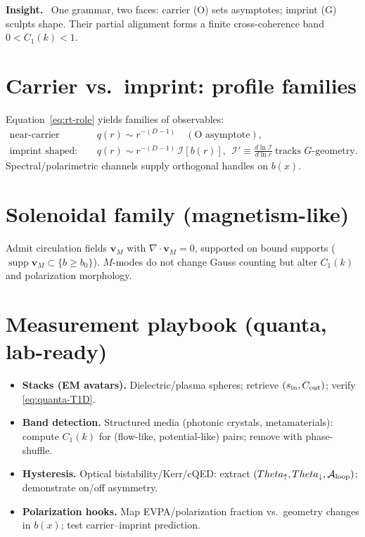 \documentclass[12pt,a4paper,oneside]{scrreprt}
\def\Theta{Theta}%
\newenvironment{insight}{\par\vspace{0.5em}\noindent\textbf{Insight.}\ }{\par\vspace{0.5em}}
\begin{document}
\begin{insight}
One grammar, two faces: carrier (O) sets asymptotes; imprint (G) sculpts shape. Their partial alignment forms a finite cross-coherence band $0<C_1(k)<1$.
\end{insight}

\section{Carrier vs.\ imprint: profile families}\label{sec:carrier-imprint}
Equation~\eqref{eq:rt-role} yields families of observables:
\begin{align}
\text{near-carrier dominated: } & q(r)\sim r^{-(D-1)} \quad (\text{O asymptote}),\\
\text{imprint shaped: } & q(r)\sim r^{-(D-1)}\,\mathcal I[b(r)],\ \ 
\mathcal I' \equiv \frac{d\ln \mathcal I}{d\ln r} \ \text{tracks $G$-geometry}.
\end{align}
Spectral/polarimetric channels supply orthogonal handles on $b(x)$.

\section{Solenoidal family (magnetism-like)}\label{sec:solenoids}
Admit circulation fields $\mathbf v_M$ with $\nabla\!\cdot\mathbf v_M=0$, supported on bound supports ($\operatorname{supp}\mathbf v_M\subset\{b\ge b_0\}$). $M$-modes do not change Gauss counting but alter $C_1(k)$ and polarization morphology.

\section{Measurement playbook (quanta, lab-ready)}\label{sec:quanta-playbook}
\begin{itemize}
\item \textbf{Stacks (EM avatars).} Dielectric/plasma spheres; retrieve $(s_{\rm in},C_{\rm out})$; verify \eqref{eq:quanta-T1D}.
\item \textbf{Band detection.} Structured media (photonic crystals, metamaterials): compute $C_1(k)$ for (flow-like, potential-like) pairs; remove with phase-shuffle.
\item \textbf{Hysteresis.} Optical bistability/Kerr/cQED: extract $(\Theta_\uparrow,\Theta_\downarrow,\mathcal A_{\rm loop})$; demonstrate on/off asymmetry.
\item \textbf{Polarization hooks.} Map EVPA/polarization fraction vs.\ geometry changes in $b(x)$; test carrier–imprint prediction.
\end{itemize}
\end{document}
